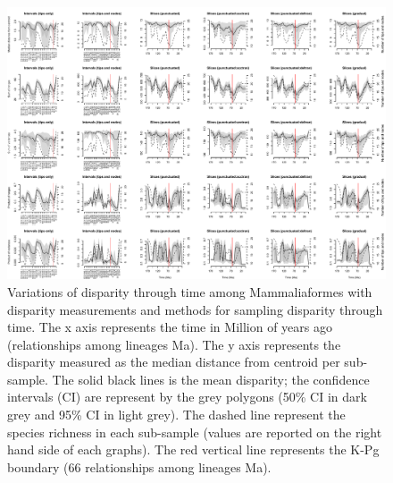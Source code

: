 \begin{landscape}
\begin{figure}[!htbp]
\centering
    \includegraphics[width=\textwidth,height=\textheight,keepaspectratio]{Supplementaries/Figures/STD/Mammaliaformes_all_methods.pdf}
\caption[Comparison of all the disparity metrics and all the time series methods for Mammaliaformes]{Variations of disparity through time among Mammaliaformes with disparity measurements and methods for sampling disparity through time. The x axis represents the time in Million of years ago (relationships among lineages
Ma). The y axis represents the disparity measured as the median distance from centroid per sub-sample. The solid black lines is the mean disparity; the confidence intervals (CI) are represent by the grey polygons (50\% CI in dark grey and 95\% CI in light grey). The dashed line represent the species richness in each sub-sample (values are reported on the right hand side of each graphs). The red vertical line represents the K-Pg boundary (66 relationships among lineages
Ma).}
\label{Supp_disparity_all_Mammaliaformes}
\end{figure}
\end{landscape}

